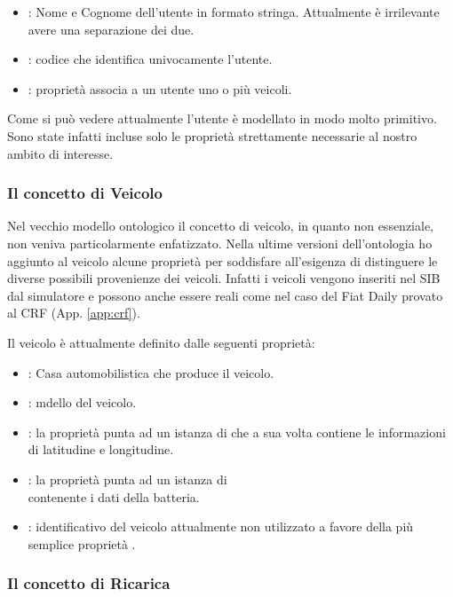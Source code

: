 \begin{itemize}
	\item {}: Nome e Cognome dell'utente in formato stringa. Attualmente è irrilevante avere una separazione dei due. 
	\item {}: codice che identifica univocamente l'utente.
	\item {}: proprietà associa a un utente uno o più veicoli.
\end{itemize}

\noindent
Come si può vedere attualmente l'utente è modellato in modo molto primitivo. Sono state infatti incluse solo le proprietà strettamente necessarie al nostro ambito di interesse. 

\subsubsection{Il concetto di Veicolo}\label{subsubsec:vehicle}

Nel vecchio modello ontologico il concetto di veicolo, in quanto non essenziale, non veniva particolarmente enfatizzato. Nella ultime versioni dell'ontologia ho aggiunto al veicolo alcune proprietà per soddisfare all'esigenza di distinguere le diverse possibili provenienze dei veicoli. Infatti i veicoli vengono inseriti nel SIB dal simulatore e possono anche essere reali come nel caso del Fiat Daily provato al CRF (App. \ref{app:crf}).

Il veicolo è attualmente definito dalle seguenti proprietà:

\begin{itemize}
	\item {}: Casa automobilistica che produce il veicolo.
	\item {}: mdello del veicolo.
	\item {}: la proprietà punta ad un istanza di  che a sua volta contiene le informazioni di latitudine e longitudine.
	\item {}: la proprietà punta ad un istanza di \\  contenente i dati della batteria.
	\item {}: identificativo del veicolo attualmente non utilizzato a favore della più semplice proprietà .
\end{itemize}

\subsubsection{Il concetto di Ricarica}

